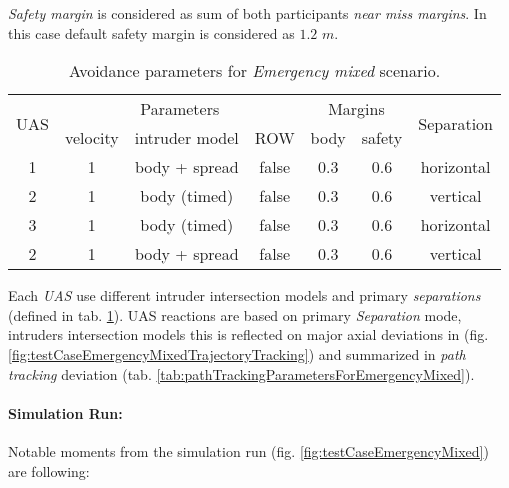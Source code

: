     \emph{Safety margin} is considered as sum of both participants \emph{near miss margins}. In this case default safety margin is considered as $1.2$  $m$.
    
    \begin{table}[H]
        \centering
        \begin{tabular}{c||c|c|c||c|c||c}
            \multirow{2}{*}{UAS} & \multicolumn{3}{c||}{Parameters} & \multicolumn{2}{c||}{Margins} & \multirow{2}{*}{Separation}\\\cline{2-6}
                                 & velocity & intruder model & ROW        & body & safety                                        \\\hline\hline
            1                    & 1        & body + spread  & false            & 0.3         & 0.6           & horizontal       \\\hline
            2                    & 1        & body (timed)   & false            & 0.3         & 0.6           & vertical         \\\hline
            3                    & 1        & body (timed)   & false            & 0.3         & 0.6           & horizontal       \\\hline
            2                    & 1        & body + spread  & false            & 0.3         & 0.6           & vertical         \\
        \end{tabular}
        \caption{Avoidance parameters for  \emph{Emergency mixed} scenario.}
        \label{tab:aboidanceParametersForEmergencyMixedScenario}
    \end{table}
    
    \begin{note}
        Each \emph{UAS} use different intruder intersection models and primary \emph{separations} (defined in tab. \ref{tab:aboidanceParametersForEmergencyMixedScenario}).  UAS reactions are based on primary \emph{Separation} mode, intruders intersection models this is reflected on major axial deviations in (fig. \ref{fig:testCaseEmergencyMixedTrajectoryTracking}) and summarized in \emph{path tracking} deviation (tab. \ref{tab:pathTrackingParametersForEmergencyMixed}).
    \end{note}
    
    \noindent\paragraph{Simulation Run:} Notable moments from the simulation run (fig. \ref{fig:testCaseEmergencyMixed}) are following:
    
